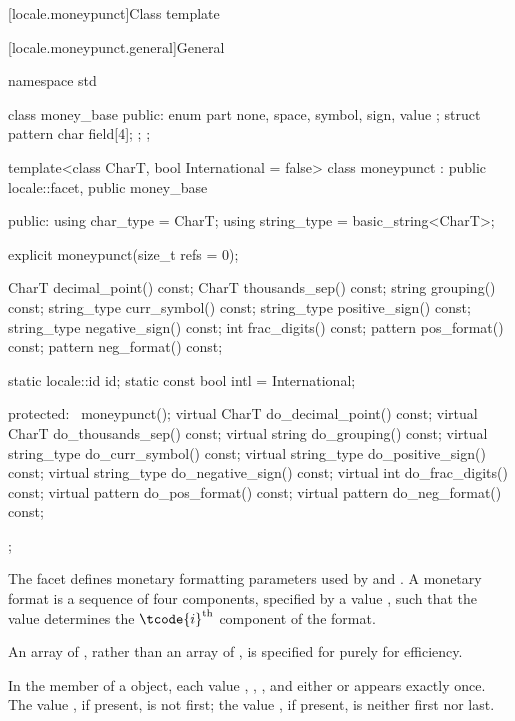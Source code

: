 [locale.moneypunct]{Class template }

[locale.moneypunct.general]{General}

%
\begin{codeblock}
namespace std {
  class money_base {
  public:
    enum part { none, space, symbol, sign, value };
    struct pattern { char field[4]; };
  };

  template<class CharT, bool International = false>
    class moneypunct : public locale::facet, public money_base {
    public:
      using char_type   = CharT;
      using string_type = basic_string<CharT>;

      explicit moneypunct(size_t refs = 0);

      CharT       decimal_point() const;
      CharT       thousands_sep() const;
      string      grouping()      const;
      string_type curr_symbol()   const;
      string_type positive_sign() const;
      string_type negative_sign() const;
      int         frac_digits()   const;
      pattern     pos_format()    const;
      pattern     neg_format()    const;

      static locale::id id;
      static const bool intl = International;

    protected:
      ~moneypunct();
      virtual CharT       do_decimal_point() const;
      virtual CharT       do_thousands_sep() const;
      virtual string      do_grouping()      const;
      virtual string_type do_curr_symbol()   const;
      virtual string_type do_positive_sign() const;
      virtual string_type do_negative_sign() const;
      virtual int         do_frac_digits()   const;
      virtual pattern     do_pos_format()    const;
      virtual pattern     do_neg_format()    const;
    };
}
\end{codeblock}

\pnum
The  facet defines monetary formatting parameters
used by  and .
A monetary format is a sequence of four components,
specified by a  value ,
such that the  value 
determines the $\tcode{i}^\text{th}$ component of the format.
\begin{footnote}
An array of ,
rather than an array of ,
is specified for  purely for efficiency.
\end{footnote}
In the  member of a  object,
each value , , , and
either  or 
appears exactly once.
The value , if present, is not first;
the value , if present, is neither first nor last.

